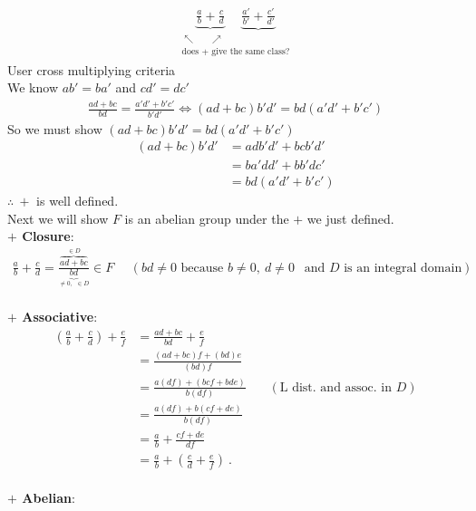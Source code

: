 \begin{theorem}
\begin{align}
        \underset{\substack{\nwarrow \ \ \ \ \ \ \ \nearrow \\ \text{does }+\text{ give the same class?}}}{\underbrace{\frac{a}{b}+\frac{c}{d}} \ \ \ \ \ \ \underbrace{\frac{a'}{b'}+\frac{c'}{d'}}} \nonumber
    \end{align}
    User cross multiplying criteria \steezybreak \\
    We know $ab'=ba'$ and $cd'=dc'$
    \begin{align}
        \frac{ad+bc}{bd} = \frac{a'd'+b'c'}{b'd'} \iff (ad+bc)b'd' = bd(a'd'+b'c') \nonumber
    \end{align}
    So we must show $(ad+bc)b'd' = bd(a'd'+b'c')$
    \begin{align}
        (ad+bc)b'd' &= adb'd'+bcb'd' \nonumber \\
        &= ba'dd' + bb'dc' \nonumber \\
        &= bd(a'd'+b'c')\nonumber
    \end{align}
    $\therefore \ +$ is well defined. \steezybreak \\
    \newpage
    Next we will show $F$ is an abelian group under the $+$ we just defined. \\
    \noindent \textbf{$+$ Closure}: \\
    \begin{align}
        \frac{a}{b}+\frac{c}{d} = \frac{\overbrace{ad+bc}^{\in D}}{\underbrace{bd}_{\neq 0, \ \ \in D}} \in F \ \ \ \ \ \ (bd\neq 0\text{ because }b\neq 0, \ d\neq 0 \ \ \text{ and }D \text{ is an integral domain}) \nonumber
    \end{align}\\
    \noindent \textbf{$+$ Associative}: \\
    \begin{align}
        \left(\frac{a}{b}+\frac{c}{d}\right)+\frac{e}{f} &= \frac{ad+bc}{bd} + \frac{e}{f} \nonumber \\
        &= \frac{(ad+bc)f+(bd)e}{(bd)f} \nonumber \\
        &= \frac{a(df)+(bcf+bde)}{b(df)} \ \ \ \ \ \  \ \ (\text{L dist. and assoc. in }D) \nonumber \\
        &= \frac{a(df)+b(cf+de)}{b(df)} \nonumber \\
        &= \frac{a}{b} + \frac{cf+de}{df} \nonumber \\
        &= \frac{a}{b}+\left(\frac{c}{d}+\frac{e}{f}\right) \ . \nonumber
    \end{align}\\
    \noindent \textbf{$+$ Abelian}: \\

\end{theorem}
